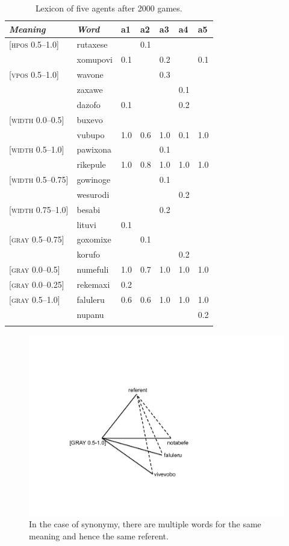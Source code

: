 \begin{table}[p]
\begin{center}
\begin{tabular}{ l  l  l  l  l  l  l  }
\lsptoprule
{\itshape Meaning}&{\itshape Word}&{\bfshape  a1}&{\bfshape  a2}&{\bfshape  a3}&{\bfshape  a4}&{\bfshape  a5} \\ \midrule
{}[\textsc{hpos} 0.5–1.0]&rutaxese& &0.1& & &\\ 
 & xomupovi&0.1& &0.2& &0.1\\ 
{}[\textsc{vpos} 0.5–1.0]&wavone& & &0.3& &\\ 
 & zaxawe& & & &0.1& \\ 
 & dazofo&0.1& & &0.2&\\ 
{}[\textsc{width} 0.0–0.5]&buxevo& & & & & \\ 
 & vubupo&1.0&0.6&1.0&0.1&1.0\\ 
{}[\textsc{width} 0.5–1.0]&pawixona& & &0.1& & \\ 
 & rikepule&1.0&0.8&1.0&1.0&1.0\\ 
{}[\textsc{width} 0.5–0.75]&gowinoge& & &0.1& &  \\ 
 & wesurodi& & & &0.2&\\ 
{}[\textsc{width} 0.75–1.0]&besabi& & &0.2& & \\ 
 & lituvi&0.1& & & & \\ 
{}[\textsc{gray} 0.5–0.75]&goxomixe& &0.1& & & \\ 
 & korufo& & & &0.2&\\ 
{}[\textsc{gray} 0.0–0.5]&numefuli&1.0&0.7&1.0&1.0&1.0\\ 
{}[\textsc{gray} 0.0–0.25]&rekemaxi&0.2& & & & \\ 
{}[\textsc{gray} 0.5–1.0]&faluleru&0.6&0.6&1.0&1.0&1.0\\ 
 & nupanu& & & & &0.2 \\ 
\lspbottomrule
\end{tabular}
\caption{\label{tab:lex2000}Lexicon of five agents after 2000 games.}
\end{center}
\end{table}

\begin{figure}[p]
  \centerline{\includegraphics[width=.50\textwidth]{chap6/figs/triangle6.pdf}}
\caption{\label{triangle6}In the case of synonymy, 
there are multiple words for the same meaning and hence the 
same referent.}
\end{figure}

